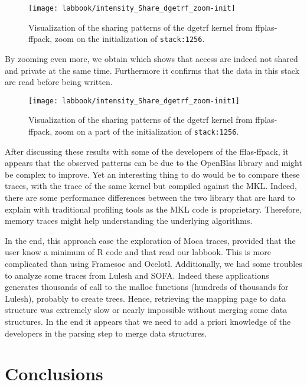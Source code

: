 \begin{figure}[htb]
    \centering
    \texttt{[image: labbook/intensity\_Share\_dgetrf\_zoom-init]}
    \caption{Visualization of the sharing patterns of the dgetrf kernel from ffplas-ffpack, zoom on the initialization of \texttt{stack:1256}.}
    \label{fig:dgetrf-share-zoom-init}
\end{figure}

By zooming even more, we obtain  which shows that access are indeed not shared and private at the same time.
Furthermore it confirms that the data in this stack are read before being written.

\begin{figure}[htb]
    \centering
    \texttt{[image: labbook/intensity\_Share\_dgetrf\_zoom-init1]}
    \caption{Visualization of the sharing patterns of the dgetrf kernel from ffplas-ffpack, zoom on a part of the initialization of \texttt{stack:1256}.}
    \label{fig:dgetrf-share-zoom-init1}
\end{figure}
\afterpage{\clearpage}

After discussing these results with some of the developers of the fflas-ffpack, it appears that the observed patterns can be due to the OpenBlas library and might be complex to improve.
Yet an interesting thing to do would be to compare these traces, with the trace of the same kernel but compiled against the \gls{MKL}.
Indeed, there are some performance differences between the two library that are hard to explain with traditional profiling tools as the \gls{MKL} code is proprietary.
Therefore, memory traces might help understanding the underlying algorithms.

In the end, this approach ease the exploration of \gls{Moca} traces, provided that the user know a minimum of \gls{R} code and that read our labbook.
This is more complicated than using \gls{Framesoc} and \gls{Ocelotl}.
Additionally, we had some troubles to analyze some traces from Lulesh and \gls{SOFA}.
Indeed these applications generates thousands of call to the malloc functions (hundreds of thousands for Lulesh), probably to create trees.
Hence, retrieving the mapping page to data structure was extremely slow or nearly impossible without merging some data structures.
In the end it appears that we need to add a priori knowledge of the developers in the parsing step to merge data structures.%


\section{Conclusions}
\label{sec:visu-cncl}

